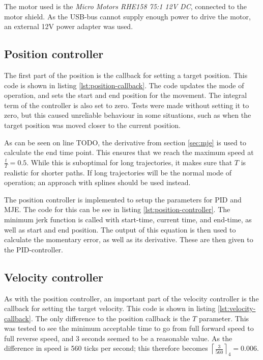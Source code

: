 \documentclass[11pt]{article}
\begin{document}
The motor used is the \emph{Micro Motors RHE158 75:1 12V DC}, connected to the motor shield. As the USB-bus cannot supply enough power to drive the motor, an external 12V power adapter was used. 
\subsection{Position controller}
The first part of the position is the callback for setting a target position. This code is shown in listing \vref{lst:position-callback}. The code updates the mode of operation, and sets the start and end position for the movement. The integral term of the controller is also set to zero. Tests were made without setting it to zero, but this caused unreliable behaviour in some situations, such as when the target position was moved closer to the current position. \par

As can be seen on line TODO, the derivative from section \vref{sec:mje} is used to calculate the end time point. This ensures that we  reach the maximum speed at $\frac{t}{T} = 0.5$. While this is suboptimal for long trajectories, it makes sure that $T$ is realistic for shorter paths. If long trajectories will be the normal mode of operation; an approach with splines should be used instead. \par



The position controller is implemented to setup the parameters for PID and MJE. The code for this can be see in listing \vref{lst:position-controller}. The minimum jerk function is called with start-time, current time, and end-time, as well as start and end position. The output of this equation is then used to calculate the momentary error, as well as its derivative. These are then given to the PID-controller. \par



\subsection{Velocity controller}
As with the position controller, an important part of the velocity controller is the callback for setting the target velocity. This code is shown in listing \vref{lst:velocity-callback}. The only difference to the position callback is the $T$ parameter. This was tested to see the minimum acceptable time to go from full forward speed to full reverse speed, and 3 seconds seemed to be a reasonable value. As the difference in speed is 560 ticks per second; this therefore becomes $\left\lceil\frac{3}{560}\right\rceil _4 = 0.006$. \par
\end{document}
